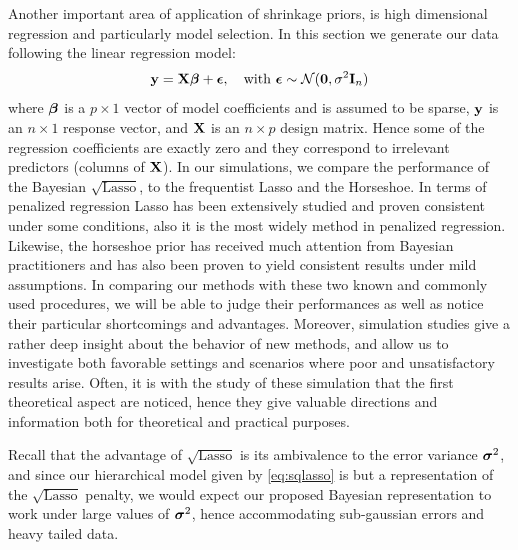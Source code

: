 \documentclass[chapters]{uamaththesis}
\begin{document}
Another important area of application of shrinkage priors, is high dimensional regression and particularly model selection. In this section we generate our data following the linear regression model:
$$ {\bf y}  = {\bf X}\boldsymbol{\beta} + \boldsymbol{\epsilon}, \quad \text{with } \boldsymbol{\epsilon} \sim \mathcal{N}({\bf 0} , \sigma^2 {\bf I}_n ) $$
where $\boldsymbol{\beta}$ is a $p\times 1$ vector of model coefficients and is assumed to be sparse, ${\bf y}$ is an $n\times 1$ response vector, and $\bf X$ is an $n\times p$ design matrix. Hence some of the regression coefficients are exactly zero and they correspond to irrelevant predictors (columns of ${\bf X}$). In our simulations, we compare the performance of the Bayesian $\sqrt{\text{Lasso}}$, to the frequentist Lasso and the Horseshoe. In terms of penalized regression Lasso has been extensively studied and proven consistent under some conditions, also it is the most widely method in penalized regression. Likewise, the horseshoe prior has received much attention from Bayesian practitioners and has also been  proven to yield consistent results under mild assumptions. In comparing our methods with these two known and commonly used procedures, we will be able to judge their performances as well as notice their particular shortcomings and advantages. Moreover, simulation studies give a rather deep insight about the behavior of new methods, and allow us to investigate both favorable settings and scenarios where poor and unsatisfactory results arise. Often, it is with the study of these simulation that the first theoretical aspect are noticed, hence they give valuable directions and information both for theoretical and practical purposes.

Recall that the advantage of $\sqrt{\text{Lasso}}$ is its ambivalence to the error variance $\boldsymbol{\sigma}^2$, and since our hierarchical model given by \eqref{eq:sqlasso} is but a representation of the $\sqrt{\text{Lasso}}$ penalty, we would expect our proposed Bayesian representation to work under large values of $\boldsymbol{\sigma}^2$, hence accommodating sub-gaussian errors and heavy tailed data.
\end{document}
